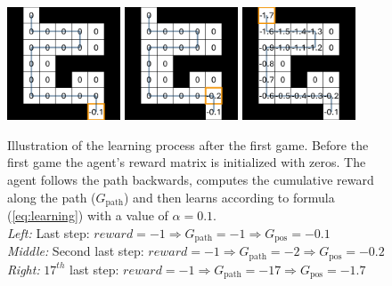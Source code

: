\documentclass[12pt,a4paper]{scrartcl}
\begin{document}
\begin{figure}
    \centering
    \includegraphics[width=0.3\textwidth]{learning/learning_1.png}
    \includegraphics[width=0.3\textwidth]{learning/learning_2.png}
    \includegraphics[width=0.3\textwidth]{learning/learning_end.png}
    \caption{
        Illustration of the learning process after the first game. Before the
        first game the agent's reward matrix is initialized with zeros.
        The agent follows the path backwards, computes the cumulative reward
        along the path ($G_\mathrm{path}$) and then learns according to formula
        (\ref{eq:learning}) with a value of $\alpha = 0.1$.\\
        \textit{Left:} Last step: 
        $reward = -1 \Rightarrow G_\mathrm{path} = -1 \Rightarrow 
            G_\mathrm{pos} = -0.1$ \\
        \textit{Middle:} Second last step: 
        $reward = -1 \Rightarrow G_\mathrm{path} = -2 \Rightarrow 
            G_\mathrm{pos} = -0.2$ \\
        \textit{Right:} $17^{th}$ last step: 
        $reward = -1 \Rightarrow G_\mathrm{path} = -17 \Rightarrow 
            G_\mathrm{pos} = -1.7$
    }
    \label{fig:learning}
\end{figure}
\end{document}
